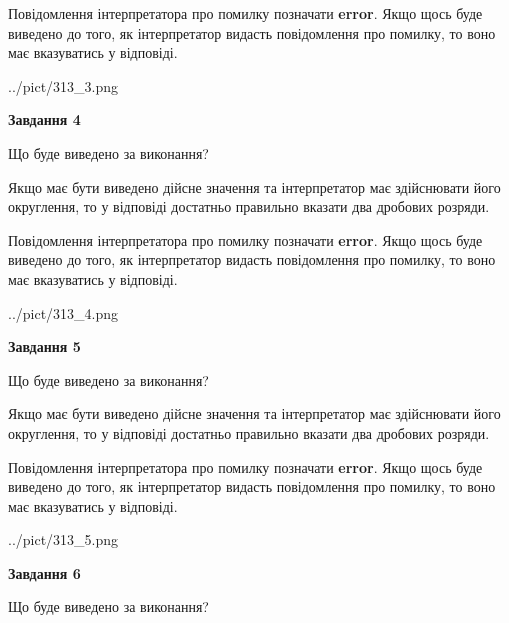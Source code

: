 \documentclass[12pt, ukrainian]{article}
\begin{document}
{\begin {Large}
Повідомлення інтерпретатора про помилку позначати \textbf{error}.
Якщо щось буде виведено до того, як інтерпретатор видасть повідомлення про помилку, 
то воно має вказуватись у відповіді. \par

\begin{center}
	{../pict/313_3.png}
\end{center}
\newpage

{\begin {center}\textbf{Завдання 4}\end {center}}\par
Що буде виведено за виконання? \par

Якщо має бути виведено дійсне значення та інтерпретатор має здійснювати його округлення, 
то у відповіді достатньо правильно вказати два дробових розряди.

Повідомлення інтерпретатора про помилку позначати \textbf{error}.
Якщо щось буде виведено до того, як інтерпретатор видасть повідомлення про помилку, 
то воно має вказуватись у відповіді. \par

\begin{center}
	{../pict/313_4.png}
\end{center}
\newpage

{\begin {center}\textbf{Завдання 5}\end {center}}\par
Що буде виведено за виконання? \par

Якщо має бути виведено дійсне значення та інтерпретатор має здійснювати його округлення, 
то у відповіді достатньо правильно вказати два дробових розряди.

Повідомлення інтерпретатора про помилку позначати \textbf{error}.
Якщо щось буде виведено до того, як інтерпретатор видасть повідомлення про помилку, 
то воно має вказуватись у відповіді. \par

\begin{center}
	{../pict/313_5.png}
\end{center}
\newpage

{\begin {center}\textbf{Завдання 6}\end {center}}\par
Що буде виведено за виконання? \par


\end{Large}}
\end{document}
